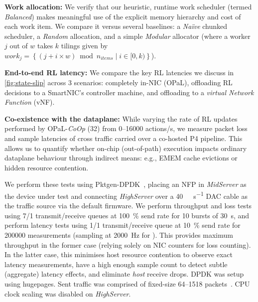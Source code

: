 \documentclass[
conference
,10pt
]{IEEEtran}
\newcommand{\fakepara}[1]{\noindent\textbf{#1:}}
\newcommand{\approachshort}{OPaL}
\newcommand{\Coopfw}{\emph{CoOp}}
\begin{document}
\fakepara{Work allocation}
We verify that our heuristic, runtime work scheduler (termed \emph{Balanced}) makes meaningful use of the explicit memory hierarchy and cost of each work item.
We compare it versus several baselines: a \emph{Na\"{i}ve} chunked scheduler, a \emph{Random} allocation, and a simple \emph{Modular} allocator (where a worker $j$ out of $w$ takes $k$ tilings given by $\mathit{work}_j=\left\{\left(j + i \times w\right) \bmod n_{\mathit{items}} \mid i \in [0,k) \right\}$).

\fakepara{End-to-end RL latency}
We compare the key RL latencies we discuss in \cref{fig:state-slip} across 3 scenarios: completely in-NIC (\approachshort{}), offloading RL decisions to a SmartNIC's controller machine, and offloading to a \emph{virtual Network Function} (vNF).

\fakepara{Co-existence with the dataplane}
While varying the rate of RL updates performed by \approachshort{}-\Coopfw{} (\SI{32}{\bit}) from \numrange{0}{16000} actions/s, we measure packet loss and sample latencies of cross traffic carried over a co-hosted P4 pipeline.
This allows us to quantify whether on-chip (out-of-path) execution impacts ordinary dataplane behaviour through indirect means: e.g., EMEM cache evictions or hidden resource contention.

We perform these tests using Pktgen-DPDK~\cite{pktgen-dpdk}, placing an NFP in \emph{MidServer} as the device under test and connecting \emph{HighServer} over a \SI{40}{\giga\bit\per\second} DAC cable as the traffic source via the default firmware.
We perform throughput and loss tests using \num{7}/\num{1} transmit/receive queues at \SI{100}{\percent} send rate for 10 bursts of \SI{30}{\second}, and perform latency tests using \num{1}/\num{1} transmit/receive queue at \SI{10}{\percent} send rate for \num{200000} measurements (sampling at \SI{2000}{\hertz} for ).
This provides maximum throughput in the former case (relying solely on NIC counters for loss counting).
In the latter case, this minimises host resource contention to observe exact latency measurements, have a high enough sample count to detect subtle (aggregate) latency effects, and eliminate \emph{host} receive drops.
DPDK was setup using  hugepages.
Sent traffic was comprised of fixed-size \SIrange{64}{1518}{\byte} packets~\cite{rfc2544}.
CPU clock scaling was disabled on \emph{HighServer}.
\end{document}
